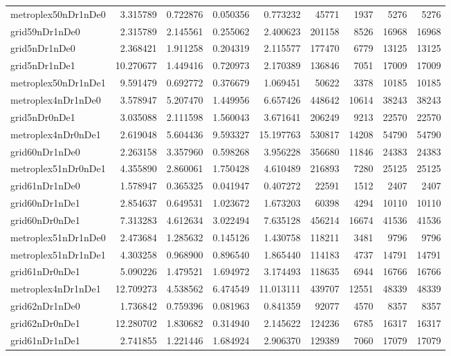\begin{longtable}{|l|r|r|r|r|r|r|r|r|}
metroplex50nDr1nDe0 & 3.315789 & 0.722876 & 0.050356 & 0.773232 & 45771 & 1937 & 5276 & 5276 \\
grid59nDr1nDe0 & 2.315789 & 2.145561 & 0.255062 & 2.400623 & 201158 & 8526 & 16968 & 16968 \\
grid5nDr1nDe0 & 2.368421 & 1.911258 & 0.204319 & 2.115577 & 177470 & 6779 & 13125 & 13125 \\
grid5nDr1nDe1 & 10.270677 & 1.449416 & 0.720973 & 2.170389 & 136846 & 7051 & 17009 & 17009 \\
metroplex50nDr1nDe1 & 9.591479 & 0.692772 & 0.376679 & 1.069451 & 50622 & 3378 & 10185 & 10185 \\
metroplex4nDr1nDe0 & 3.578947 & 5.207470 & 1.449956 & 6.657426 & 448642 & 10614 & 38243 & 38243 \\
grid5nDr0nDe1 & 3.035088 & 2.111598 & 1.560043 & 3.671641 & 206249 & 9213 & 22570 & 22570 \\
metroplex4nDr0nDe1 & 2.619048 & 5.604436 & 9.593327 & 15.197763 & 530817 & 14208 & 54790 & 54790 \\
grid60nDr1nDe0 & 2.263158 & 3.357960 & 0.598268 & 3.956228 & 356680 & 11846 & 24383 & 24383 \\
metroplex51nDr0nDe1 & 4.355890 & 2.860061 & 1.750428 & 4.610489 & 216893 & 7280 & 25125 & 25125 \\
grid61nDr1nDe0 & 1.578947 & 0.365325 & 0.041947 & 0.407272 & 22591 & 1512 & 2407 & 2407 \\
grid60nDr1nDe1 & 2.854637 & 0.649531 & 1.023672 & 1.673203 & 60398 & 4294 & 10110 & 10110 \\
grid60nDr0nDe1 & 7.313283 & 4.612634 & 3.022494 & 7.635128 & 456214 & 16674 & 41536 & 41536 \\
metroplex51nDr1nDe0 & 2.473684 & 1.285632 & 0.145126 & 1.430758 & 118211 & 3481 & 9796 & 9796 \\
metroplex51nDr1nDe1 & 4.303258 & 0.968900 & 0.896540 & 1.865440 & 114183 & 4737 & 14791 & 14791 \\
grid61nDr0nDe1 & 5.090226 & 1.479521 & 1.694972 & 3.174493 & 118635 & 6944 & 16766 & 16766 \\
metroplex4nDr1nDe1 & 12.709273 & 4.538562 & 6.474549 & 11.013111 & 439707 & 12551 & 48339 & 48339 \\
grid62nDr1nDe0 & 1.736842 & 0.759396 & 0.081963 & 0.841359 & 92077 & 4570 & 8357 & 8357 \\
grid62nDr0nDe1 & 12.280702 & 1.830682 & 0.314940 & 2.145622 & 124236 & 6785 & 16317 & 16317 \\
grid61nDr1nDe1 & 2.741855 & 1.221446 & 1.684924 & 2.906370 & 129389 & 7060 & 17079 & 17079 \\

\end{longtable}
